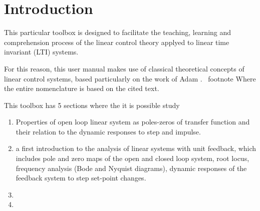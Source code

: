 
\chapter{Introduction} \label{Intro_chapter}

This particular toolbox is designed to facilitate the teaching, learning  and comprehension process of the linear control theory applyed to linear time invariant  (LTI) systems.

For this reason, this user manual makes use of classical theoretical concepts of linear control systems, based particularly on the work of Adam \cite{Adam2018}. \ footnote {Where the entire nomenclature is based on the cited text.}
 
This toolbox has 5 sections where the it is possible study
\begin{enumerate}
	\item Properties of open loop linear system as poles-zeros of transfer function and their relation to the dynamic responses to step and impulse.
	\item a first introduction to the analysis of linear systems with unit feedback, which includes pole and zero maps of the open and closed loop system, root locus, frequency analysis (Bode and Nyquist diagrams), 	dynamic responses of the feedback system to step set-point changes.
	\item 
	\item 
\end{enumerate}



